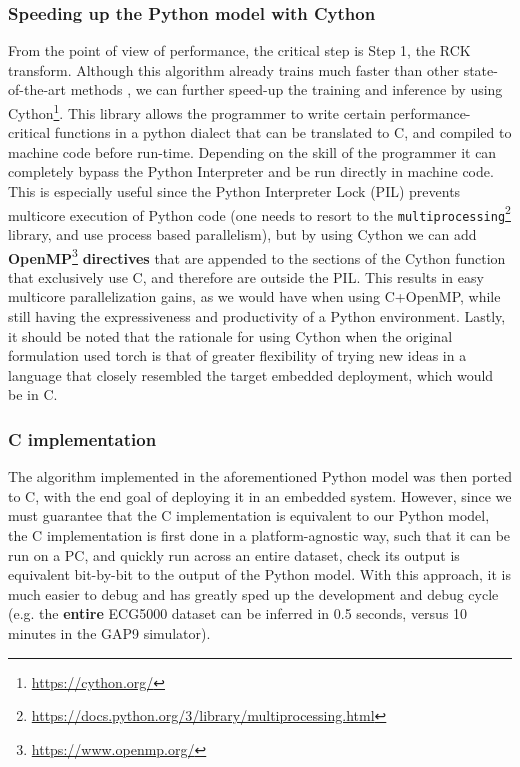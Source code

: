     \subsubsection{Speeding up the Python model with Cython}
    From the point of view of performance, the critical step is Step 1, the RCK transform. Although this algorithm already trains much faster than other state-of-the-art methods \cite{Dempster2023Hydra},
    we can further speed-up the training and inference by using Cython\footnote{\href{https://cython.org/}{https://cython.org/}}. This library allows the programmer to write certain performance-critical functions
    in a python dialect that can be translated to C, and compiled to machine code before run-time. Depending on the skill of the programmer it can completely bypass the Python Interpreter and be run directly in machine code.
    This is especially useful since the Python Interpreter Lock (PIL) prevents multicore execution of Python code (one needs to resort to the \verb|multiprocessing|\footnote{\href{https://docs.python.org/3/library/multiprocessing.html}{https://docs.python.org/3/library/multiprocessing.html}} library, and use process
    based parallelism), but by using Cython we can add \textbf{OpenMP}\footnote{\href{https://www.openmp.org/}{https://www.openmp.org/}} \textbf{directives} that are appended to the sections of the Cython function that exclusively use C, and therefore are outside the PIL. This results
    in easy multicore parallelization gains, as we would have when using C+OpenMP, while still having the expressiveness and productivity of a Python environment. Lastly, it should be noted that the rationale for using Cython when the original
    formulation used torch is that of greater flexibility of trying new ideas in a language that closely resembled the target embedded deployment, which would be in C.

    \subsubsection{C implementation}\label{sec:im_cim}
    The algorithm implemented in the aforementioned Python model was then ported to C, with the end goal of deploying it in an embedded system. 
    However, since we must guarantee that the C implementation is equivalent to our Python model, the C implementation is first done in a platform-agnostic way,
    such that it can be run on a PC, and quickly run across an entire dataset, check its output is equivalent bit-by-bit to the output of the Python model. With this approach, 
    it is much easier to debug and has greatly sped up the development and debug cycle (e.g. the \textbf{entire} ECG5000 dataset can be inferred in 0.5 seconds, versus 10 minutes in the GAP9 simulator).
    
